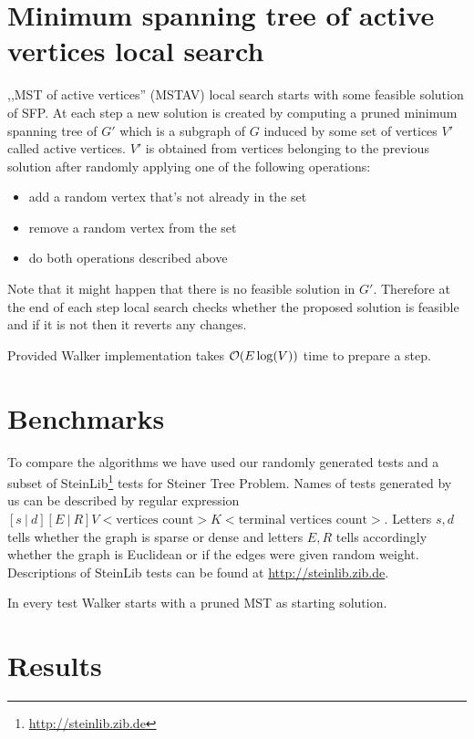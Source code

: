\section{Minimum spanning tree of active vertices local search}
,,MST of active vertices'' (MSTAV) local search starts with some feasible solution of SFP. At each step a new solution is created by computing a pruned minimum spanning tree of $G'$ which is a subgraph of $G$ induced by some set of vertices $V'$ called active vertices. $V'$ is obtained from vertices belonging to the previous solution after randomly applying one of the following operations:
\begin{itemize}
\item add a random vertex that's not already in the set
\item remove a random vertex from the set
\item do both operations described above
\end{itemize}

Note that it might happen that there is no feasible solution in $G'$. Therefore at the end of each step local search checks whether the proposed solution is feasible and if it is not then it reverts any changes.

Provided Walker implementation takes $\mathcal{O}(E \log(V))$ time to prepare a step.

\section{Benchmarks}
To compare the algorithms we have used our randomly generated tests and a subset of SteinLib\footnote{\url{http://steinlib.zib.de}} tests for Steiner Tree Problem.
Names of tests generated by us can be described by regular expression $[s\ |\ d][E\ |\ R]V<\text{vertices count}>K<\text{terminal vertices count}>$. Letters $s, d$ tells whether the graph is sparse or dense and letters $E, R$ tells accordingly whether the graph is Euclidean or if the edges were given random weight. Descriptions of SteinLib tests can be found at \url{http://steinlib.zib.de}.

In every test Walker starts with a pruned MST as starting solution.
\section{Results}

